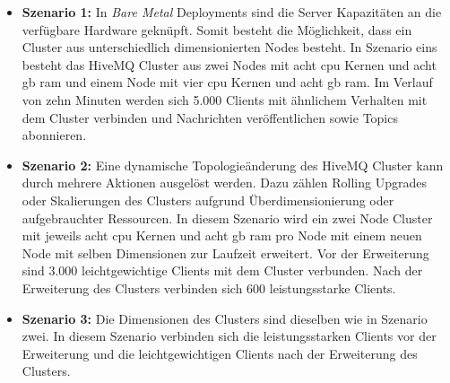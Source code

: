 \begin{itemize}
  \item \textbf{Szenario 1:} In \textit{Bare Metal} Deployments sind die Server Kapazitäten an die verfügbare Hardware geknüpft. Somit besteht die Möglichkeit, dass ein Cluster aus unterschiedlich dimensionierten Nodes besteht. In Szenario eins besteht das HiveMQ Cluster aus zwei Nodes mit acht \ac{cpu} Kernen und acht \ac{gb} \ac{ram} und einem Node mit vier \ac{cpu} Kernen und acht \ac{gb} \ac{ram}. Im Verlauf von zehn Minuten werden sich 5.000 Clients mit ähnlichem Verhalten mit dem Cluster verbinden und Nachrichten veröffentlichen sowie Topics abonnieren.
  \item \textbf{Szenario 2:} Eine dynamische Topologieänderung des HiveMQ Cluster kann durch mehrere Aktionen ausgelöst werden. Dazu zählen Rolling Upgrades oder Skalierungen des Clusters aufgrund Überdimensionierung oder aufgebrauchter Ressourcen. In diesem Szenario wird ein zwei Node Cluster mit jeweils acht \ac{cpu} Kernen und acht \ac{gb} \ac{ram} pro Node mit einem neuen Node mit selben Dimensionen zur Laufzeit erweitert. Vor der Erweiterung sind 3.000 leichtgewichtige Clients mit dem Cluster verbunden. Nach der Erweiterung des Clusters verbinden sich 600 leistungsstarke Clients.
  \item \textbf{Szenario 3:} Die Dimensionen des Clusters sind dieselben wie in Szenario zwei. In diesem Szenario verbinden sich die leistungsstarken Clients vor der Erweiterung und die leichtgewichtigen Clients nach der Erweiterung des Clusters.
\end{itemize}

